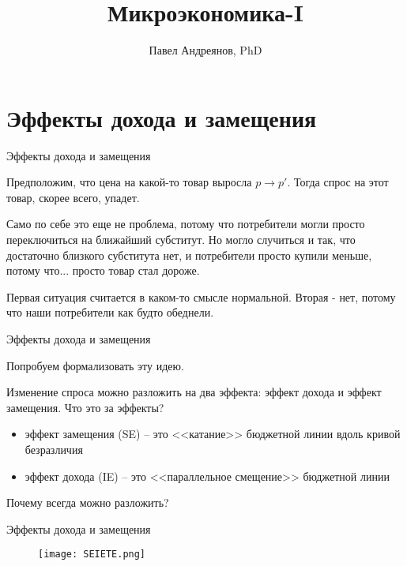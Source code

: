 \documentclass{beamer}
\title{
Микроэкономика-I
}
\author{
Павел Андреянов, PhD
}
\begin{document}
\maketitle

\section{Эффекты дохода и замещения}

\begin{frame}{Эффекты дохода и замещения}

Предположим, что цена на какой-то товар выросла $p \to p'$. Тогда спрос на этот товар, скорее всего, упадет. 

Само по себе это еще не проблема, потому что потребители могли просто переключиться на ближайший субститут. Но могло случиться и так, что достаточно близкого субститута нет, и потребители просто купили меньше, потому что... просто товар стал дороже. 

Первая ситуация считается в каком-то смысле нормальной. Вторая - нет, потому что наши потребители как будто обеднели.
\end{frame}


\begin{frame}{Эффекты дохода и замещения}

Попробуем формализовать эту идею. 

Изменение спроса можно разложить на два эффекта: эффект дохода и эффект замещения. Что это за эффекты?

\begin{itemize}
\item эффект замещения (SE) – это <<катание>> бюджетной линии вдоль кривой безразличия
\item эффект дохода (IE) – это <<параллельное смещение>> бюджетной линии
\end{itemize}

Почему всегда можно разложить? 

\end{frame}

\begin{frame}{Эффекты дохода и замещения}

\begin{figure}[hbt]
\centering
\texttt{[image: SEIETE.png]}
\end{figure}

\end{frame}
\end{document}
